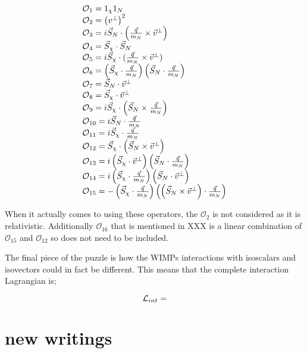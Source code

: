 \begin{equation}
\begin{array}{lcl}
\operatorname{\mathcal{O}}_{1}=1_{\chi}1_N \\ 
\operatorname{\mathcal{O}}_{2}=\left(v^{\perp}\right)^{2} \\
\operatorname{\mathcal{O}}_{3}=i \vec{S}_{N} \cdot\left(\frac{\vec{q}}{m_N} \times \vec{v}^{\perp}\right) \\ 
\operatorname{\mathcal{O}}_{4}=\vec{S}_{\chi} \cdot \vec{S}_{N} \\ 
\operatorname{\mathcal{O}}_{5}=i \vec{S}_{\chi} \cdot(\frac{\vec{q}}{m_N} \times \vec{v}^{\perp}) \\ 
\operatorname{\mathcal{O}}_{6}=\left(\vec{S}_{\chi} \cdot \frac{\vec{q}}{m_N}\right)\left(\vec{S}_{N} \cdot \frac{\vec{q}}{m_N}\right) \\
\operatorname{\mathcal{O}}_{7}=\vec{S}_{N} \cdot \vec{v}^{\perp} \\
\operatorname{\mathcal{O}}_{8}=\vec{S}_{\chi} \cdot \vec{v}^{\perp} \\ 
\operatorname{\mathcal{O}}_{9}=i \vec{S}_{\chi} \cdot\left(\vec{S}_{N} \times \frac{\vec{q}}{m_N}\right) \\
\operatorname{\mathcal{O}}_{10}=i \vec{S}_{N} \cdot \frac{\vec{q}}{m_N} \\ 
\operatorname{\mathcal{O}}_{11}=i \vec{S}_{\chi} \cdot \frac{\vec{q}}{m_N} \\
\operatorname{\mathcal{O}}_{12} =\vec{S}_{\chi} \cdot\left(\vec{S}_{N} \times \vec{v}^{\perp}\right) \\
\operatorname{\mathcal{O}}_{13} =i\left(\vec{S}_{\chi} \cdot \vec{v}^{\perp}\right)\left(\vec{S}_{N} \cdot \frac{\vec{q}}{m_N}\right) \\ 
\operatorname{\mathcal{O}}_{14} =i\left(\vec{S}_{\chi} \cdot \frac{\vec{q}}{m_N}\right)\left(\vec{S}_{N} \cdot \vec{v}^{\perp}\right) \\ 
\operatorname{\mathcal{O}}_{15} =-\left(\vec{S}_{\chi} \cdot \frac{\vec{q}}{m_N}\right)\left(\left(\vec{S}_{N} \times \vec{v}^{\perp}\right) \cdot \frac{\vec{q}}{m_N}\right)
\end{array}
\label{eq:EFT_Operators}
\end{equation}

\par
When it actually comes to using these operators, the $\mathcal{O}_{2}$ is not considered as it is relativistic. 
Additionally $\mathcal{O}_{16}$ that is mentioned in XXX is a linear combination of $\mathcal{O}_{15}$ and $\mathcal{O}_{12}$ so does not need to be included.

\par
The final piece of the puzzle is how the WIMPs interactions with isoscalars and isovectors could in fact be different.
This means that the complete interaction Lagrangian is;

\begin{equation}
    \operatorname{\mathcal{L}}_{int} = 
    \label{eq:HENR_Interaction_Lagrangian}
\end{equation}

\section{new writings}
\fi